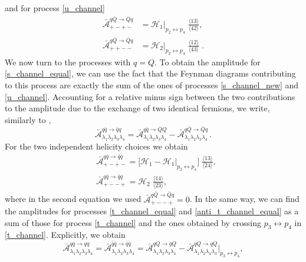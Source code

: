 and for process \eqref{u_channel} 
\begin{align}
\bar{\mathcal{A}}_{+-+-}^{\scriptstyle q\bar Q\rightarrow \bar Q q } &= \mathcal{H}_1|_{p_2 \leftrightarrow p_4}  \;  \frac{ \langle 13 \rangle}{\langle 42 \rangle} ,   \\ \bar{\mathcal{A}}_{++--}^{\scriptstyle q \bar Q\rightarrow \bar Q q } &= \mathcal{H}_2|_{p_2 \leftrightarrow p_4}  \;  \frac{ \langle 12 \rangle}{\langle 43 \rangle} \;.
\end{align}
We now turn to the processes with $q=Q$. 
To obtain the amplitude for \eqref{s_channel_equal}, we can use the fact that the Feynman diagrams contributing to this process are exactly the sum of the ones of processes \eqref{s_channel_new} and \eqref{u_channel}.  
Accounting for a relative minus sign between the two contributions to the amplitude due to the exchange of two identical fermions, we write, similarly to \cite{Glover:2004si},
\begin{equation}\label{equal_quarks_relation}
\bar{\mathcal{A}}_{\lambda_1\lambda_2\lambda_3\lambda_4}^{\scriptstyle q\bar q \rightarrow \bar qq} = \bar{\mathcal{A}}_{\lambda_1\lambda_2\lambda_3\lambda_4}^{\scriptstyle q\bar q \rightarrow \bar QQ}  - \bar{\mathcal{A}}_{\lambda_1\lambda_2\lambda_3\lambda_4}^{\scriptstyle q\bar Q \rightarrow \bar Q q}\,.
\end{equation}
For the two independent helicity choices we obtain
\begin{align}
&\bar{\mathcal{A}}_{+-+-}^{\scriptstyle q\bar q \rightarrow \bar  q q} = \Big[ \mathcal{H}_1 - \mathcal{H}_1|_{p_2 \leftrightarrow p_4} \Big] \; \frac{ \langle 13 \rangle}{\langle 24 \rangle},
 \label{s_equal_quarks_1}\\[8pt]
&\bar{\mathcal{A}}_{+--+}^{\scriptstyle q\bar q \rightarrow \bar  qq } = \mathcal{H}_2 \; \frac{ \langle 14 \rangle}{\langle 23 \rangle} ,\label{s_equal_quarks_2}
\end{align}
where in the second equation we used $ \bar{\mathcal{A}}_{+--+}^{\scriptstyle q\bar Q \rightarrow \bar Q q}  = 0$.
In the same way, we can find the amplitudes for processes \eqref{t_channel_equal} and \eqref{anti_t_channel_equal} as a sum of those for process \eqref{t_channel} and the ones obtained by crossing $p_3 \leftrightarrow p_4$ in \eqref{t_channel}. 
Explicitly, we obtain
\begin{equation}\label{equal_quarks_relation_2}
\bar{\mathcal{A}}_{\lambda_1\lambda_2\lambda_3\lambda_4}^{\scriptstyle q q \rightarrow q q} = \bar{\mathcal{A}}_{\lambda_1\lambda_2\lambda_3\lambda_4}^{\scriptstyle \bar q \bar q \rightarrow \bar q \bar q} = \bar{\mathcal{A}}_{\lambda_1\lambda_2\lambda_3\lambda_4}^{\scriptstyle qQ\rightarrow qQ}  - \bar{\mathcal{A}} ^{\scriptstyle qQ\rightarrow qQ}_{{\lambda_1\lambda_2\lambda_4\lambda_3}}\big|_{p_3 \leftrightarrow p_4},
\end{equation}
